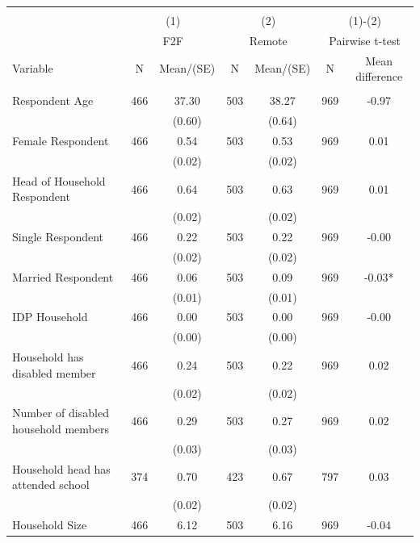 \begin{tabular}{@{\extracolsep{5pt}}lcccccc}
\\[-1.8ex]\hline \hline \\[-1.8ex]
 & \multicolumn{2}{c}{(1)}  & \multicolumn{2}{c}{(2)}  & \multicolumn{2}{c}{(1)-(2)} \\
 & \multicolumn{2}{c}{F2F}  & \multicolumn{2}{c}{Remote}  & \multicolumn{2}{c}{Pairwise t-test}  \\
Variable & N & Mean/(SE) & N & Mean/(SE) & N & Mean difference \\ \hline \\[-1.8ex] 
Respondent Age   & 466    & 37.30    & 503    & 38.27    & 969    & -0.97   \\
 &   & (0.60)  &   & (0.64)  &   &  \\ [1ex]
Female Respondent   & 466    & 0.54    & 503    & 0.53    & 969    & 0.01   \\
 &   & (0.02)  &   & (0.02)  &   &  \\ [1ex]
Head of Household Respondent   & 466    & 0.64    & 503    & 0.63    & 969    & 0.01   \\
 &   & (0.02)  &   & (0.02)  &   &  \\ [1ex]
Single Respondent   & 466    & 0.22    & 503    & 0.22    & 969    & -0.00   \\
 &   & (0.02)  &   & (0.02)  &   &  \\ [1ex]
Married Respondent   & 466    & 0.06    & 503    & 0.09    & 969    & -0.03*   \\
 &   & (0.01)  &   & (0.01)  &   &  \\ [1ex]
IDP Household   & 466    & 0.00    & 503    & 0.00    & 969    & -0.00   \\
 &   & (0.00)  &   & (0.00)  &   &  \\ [1ex]
Household has disabled member   & 466    & 0.24    & 503    & 0.22    & 969    & 0.02   \\
 &   & (0.02)  &   & (0.02)  &   &  \\ [1ex]
Number of disabled household members   & 466    & 0.29    & 503    & 0.27    & 969    & 0.02   \\
 &   & (0.03)  &   & (0.03)  &   &  \\ [1ex]
Household head has attended school   & 374    & 0.70    & 423    & 0.67    & 797    & 0.03   \\
 &   & (0.02)  &   & (0.02)  &   &  \\ [1ex]
Household Size   & 466    & 6.12    & 503    & 6.16    & 969    & -0.04   \\

\end{tabular}
